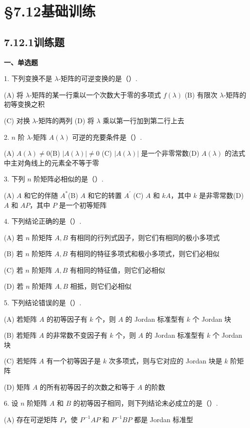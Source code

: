 \documentclass[UTF8, 12pt, fontset=fandol, oneside]{ctexart}
\begin{document}
\section*{§7.12\quad 基础训练}

\subsection*{7.12.1\quad 训练题}

\noindent\textbf{一、单选题}

1. 下列变换不是 $\lambda$-矩阵的可逆变换的是（\quad）.

(A) 将 $\lambda$-矩阵的某一行乘以一个次数大于零的多项式 $f(\lambda)$\quad
(B) 有限次 $\lambda$-矩阵的初等变换之积

(C) 对换 $\lambda$-矩阵的两列\quad
(D) 将 $\lambda$ 乘以第一行加到第二行上去

2. $n$ 阶 $\lambda$-矩阵 $A(\lambda)$ 可逆的充要条件是（\quad）.

(A) $A(\lambda)\ne0$\quad (B) $|A(\lambda)|\ne0$\quad
(C) $|A(\lambda)|$ 是一个非零常数\quad (D) $A(\lambda)$ 的法式中主对角线上的元素全不等于零

3. 下列 $n$ 阶矩阵必相似的是（\quad）.

(A) $A$ 和它的伴随 $A^*$\quad (B) $A$ 和它的转置 $A^{\prime}$\quad
(C) $A$ 和 $kA$，其中 $k$ 是非零常数\quad (D) $A$ 和 $AP$，其中 $P$ 是一个初等矩阵

4. 下列结论正确的是（\quad）.

(A) 若 $n$ 阶矩阵 $A,B$ 有相同的行列式因子，则它们有相同的极小多项式

(B) 若 $n$ 阶矩阵 $A,B$ 有相同的特征多项式和极小多项式，则它们必相似

(C) 若 $n$ 阶矩阵 $A,B$ 有相同的特征值，则它们必相似

(D) 若 $n$ 阶矩阵 $A,B$ 相抵，则它们必相似

5. 下列结论错误的是（\quad）.

(A) 若矩阵 $A$ 的初等因子有 $k$ 个，则 $A$ 的 Jordan 标准型有 $k$ 个 Jordan 块

(B) 若矩阵 $A$ 的非常数不变因子有 $k$ 个，则 $A$ 的 Jordan 标准型有 $k$ 个 Jordan 块

(C) 若矩阵 $A$ 有一个初等因子是 $k$ 次多项式，则与它对应的 Jordan 块是 $k$ 阶矩阵

(D) 矩阵 $A$ 的所有初等因子的次数之和等于 $A$ 的阶数

6. 设 $n$ 阶矩阵 $A$ 和 $B$ 的初等因子相同，则下列结论未必成立的是（\quad）.

(A) 存在可逆矩阵 $P$，使 $P^{-1}AP$ 和 $P^{-1}BP$ 都是 Jordan 标准型
\end{document}
